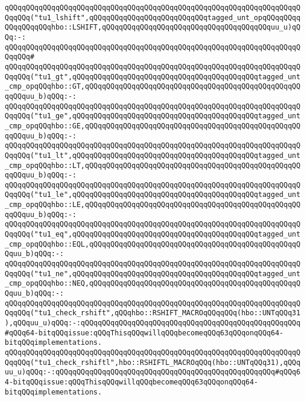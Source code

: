 \verb|qQQqqQQqqQQqqQQqqQQqqQQqqQQqqQQqqQQqqQQqqQQqqQQqqQQqqQQqqQQqqQQqqQQqqQQqqQQq("tu1_lshift",qQQqqQQqqQQqqQQqqQQqqQQqqQQqtagged_unt_opqQQqqQQqqQQqqQQqqQQqhbo::LSHIFT,qQQqqQQqqQQqqQQqqQQqqQQqqQQqqQQqqQQqqQQquu_u)qQQq:-:|\newline
\verb|qQQqqQQqqQQqqQQqqQQqqQQqqQQqqQQqqQQqqQQqqQQqqQQqqQQqqQQqqQQqqQQqqQQqqQQqqQQq#|\newline
\verb|qQQqqQQqqQQqqQQqqQQqqQQqqQQqqQQqqQQqqQQqqQQqqQQqqQQqqQQqqQQqqQQqqQQqqQQqqQQq("tu1_gt",qQQqqQQqqQQqqQQqqQQqqQQqqQQqqQQqqQQqqQQqqQQqtagged_unt_cmp_opqQQqhbo::GT,qQQqqQQqqQQqqQQqqQQqqQQqqQQqqQQqqQQqqQQqqQQqqQQqqQQqqQQquu_b)qQQq:-:|\newline
\verb|qQQqqQQqqQQqqQQqqQQqqQQqqQQqqQQqqQQqqQQqqQQqqQQqqQQqqQQqqQQqqQQqqQQqqQQqqQQq("tu1_ge",qQQqqQQqqQQqqQQqqQQqqQQqqQQqqQQqqQQqqQQqqQQqtagged_unt_cmp_opqQQqhbo::GE,qQQqqQQqqQQqqQQqqQQqqQQqqQQqqQQqqQQqqQQqqQQqqQQqqQQqqQQquu_b)qQQq:-:|\newline
\verb|qQQqqQQqqQQqqQQqqQQqqQQqqQQqqQQqqQQqqQQqqQQqqQQqqQQqqQQqqQQqqQQqqQQqqQQqqQQq("tu1_lt",qQQqqQQqqQQqqQQqqQQqqQQqqQQqqQQqqQQqqQQqqQQqtagged_unt_cmp_opqQQqhbo::LT,qQQqqQQqqQQqqQQqqQQqqQQqqQQqqQQqqQQqqQQqqQQqqQQqqQQqqQQquu_b)qQQq:-:|\newline
\verb|qQQqqQQqqQQqqQQqqQQqqQQqqQQqqQQqqQQqqQQqqQQqqQQqqQQqqQQqqQQqqQQqqQQqqQQqqQQq("tu1_le",qQQqqQQqqQQqqQQqqQQqqQQqqQQqqQQqqQQqqQQqqQQqtagged_unt_cmp_opqQQqhbo::LE,qQQqqQQqqQQqqQQqqQQqqQQqqQQqqQQqqQQqqQQqqQQqqQQqqQQqqQQquu_b)qQQq:-:|\newline
\verb|qQQqqQQqqQQqqQQqqQQqqQQqqQQqqQQqqQQqqQQqqQQqqQQqqQQqqQQqqQQqqQQqqQQqqQQqqQQq("tu1_eq",qQQqqQQqqQQqqQQqqQQqqQQqqQQqqQQqqQQqqQQqqQQqtagged_unt_cmp_opqQQqhbo::EQL,qQQqqQQqqQQqqQQqqQQqqQQqqQQqqQQqqQQqqQQqqQQqqQQqqQQquu_b)qQQq:-:|\newline
\verb|qQQqqQQqqQQqqQQqqQQqqQQqqQQqqQQqqQQqqQQqqQQqqQQqqQQqqQQqqQQqqQQqqQQqqQQqqQQq("tu1_ne",qQQqqQQqqQQqqQQqqQQqqQQqqQQqqQQqqQQqqQQqqQQqtagged_unt_cmp_opqQQqhbo::NEQ,qQQqqQQqqQQqqQQqqQQqqQQqqQQqqQQqqQQqqQQqqQQqqQQqqQQquu_b)qQQq:-:|\newline
\newline
\verb|qQQqqQQqqQQqqQQqqQQqqQQqqQQqqQQqqQQqqQQqqQQqqQQqqQQqqQQqqQQqqQQqqQQqqQQqqQQq("tu1_check_rshift",qQQqhbo::RSHIFT_MACROqQQqqQQq(hbo::UNTqQQq31),qQQquu_u)qQQq:-:qQQqqQQqqQQqqQQqqQQqqQQqqQQqqQQqqQQqqQQqqQQqqQQqqQQq#qQQq64-bitqQQqissue:qQQqThisqQQqwillqQQqbecomeqQQq63qQQqonqQQq64-bitqQQqimplementations.|\newline
\verb|qQQqqQQqqQQqqQQqqQQqqQQqqQQqqQQqqQQqqQQqqQQqqQQqqQQqqQQqqQQqqQQqqQQqqQQqqQQq("tu1_check_rshiftl",hbo::RSHIFTL_MACROqQQq(hbo::UNTqQQq31),qQQquu_u)qQQq:-:qQQqqQQqqQQqqQQqqQQqqQQqqQQqqQQqqQQqqQQqqQQqqQQqqQQq#qQQq64-bitqQQqissue:qQQqThisqQQqwillqQQqbecomeqQQq63qQQqonqQQq64-bitqQQqimplementations.|\newline
